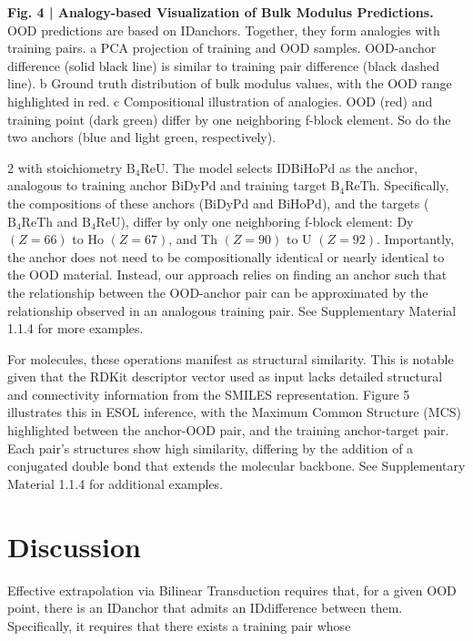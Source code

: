 \documentclass[10pt]{article}
\begin{document}
{\footnotesize\textbf{Fig. 4 | Analogy-based Visualization of Bulk Modulus Predictions.} OOD predictions are based on IDanchors. Together, they form analogies with training pairs. a PCA projection of training and OOD samples. OOD-anchor difference (solid black line) is similar to training pair difference (black dashed line). b Ground truth distribution of bulk modulus values, with the OOD range highlighted in red. c Compositional illustration of analogies. OOD (red) and training point (dark green) differ by one neighboring f-block element. So do the two anchors (blue and light green, respectively).\par}

\vspace{0.8em}
\begin{multicols}{2}
\footnotesize
with stoichiometry $\mathrm{B_4ReU}$. The model selects IDBiHoPd as the anchor, analogous to training anchor BiDyPd and training target $\mathrm{B_4ReTh}$. Specifically, the compositions of these anchors (BiDyPd and BiHoPd), and the targets ($\mathrm{B_4ReTh}$ and $\mathrm{B_4ReU}$), differ by only one neighboring f-block element: Dy $(Z = 66)$ to Ho $(Z = 67)$, and Th $(Z = 90)$ to U $(Z = 92)$. Importantly, the anchor does not need to be compositionally identical or nearly identical to the OOD material. Instead, our approach relies on finding an anchor such that the relationship between the OOD-anchor pair can be approximated by the relationship observed in an analogous training pair. See Supplementary Material 1.1.4 for more examples.

For molecules, these operations manifest as structural similarity. This is notable given that the RDKit descriptor vector used as input lacks detailed structural and connectivity information from the SMILES representation. Figure 5 illustrates this in ESOL inference, with the Maximum Common Structure (MCS) highlighted between the anchor-OOD pair, and the training anchor-target pair. Each pair's structures show high similarity, differing by the addition of a conjugated double bond that extends the molecular backbone. See Supplementary Material 1.1.4 for additional examples.

\section*{Discussion}
Effective extrapolation via Bilinear Transduction requires that, for a given OOD point, there is an IDanchor that admits an IDdifference between them. Specifically, it requires that there exists a training pair whose


\end{multicols}
\end{document}
